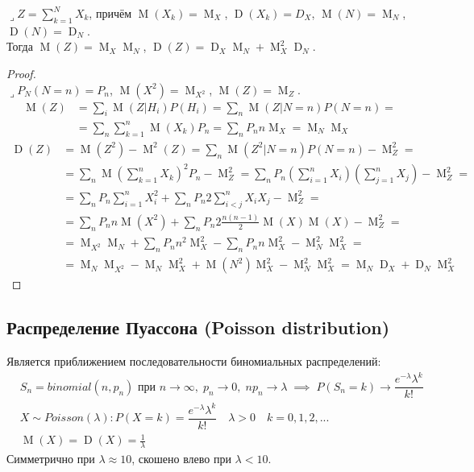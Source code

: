 \documentclass[a4paper,12pt,fleqn]{article}
\newenvironment{onsamepage} {\begin{minipage}{\textwidth}} {\end{minipage}}
\numberwithin{figure}{section}
\theoremstyle{definition}
\DeclareMathOperator{\M}{M}
\DeclareMathOperator{\D}{D}
\def\lets{{\huge$\lrcorner$}\space}
\begin{document}
\begin{onsamepage}
\lets $Z=\sum_{k=1}^N X_k$,
	причём $\M(X_k)=\M_X$, $\D(X_k)=D_X$, $\M(N)=\M_N$, $\D(N)=\D_N$. \\
Тогда $\M(Z) = \M_X \M_N$, $\D(Z) = \D_X \M_N + \M_X^2 \D_N$.
\begin{proof} ~\\
\lets $P_N(N=n) = P_n$, $\M(X^2) = \M_{X^2}$, $\M(Z) = \M_Z$.
\begin{align*}
	\M(Z) &= \sum_i \M(Z|H_i) P(H_i) = \sum_n \M(Z|N=n) P(N=n) = \\
	      &= \sum_n \sum_{k=1}^n \M(X_k) P_n = \sum_n P_n n \M_X = \M_N \M_X
\end{align*}
\begin{align*}
	\D(Z) &= \M(Z^2) - \M^2(Z) = \sum_n \M(Z^2|N=n) P(N=n) - \M_Z^2 = \\
		  &= \sum_n \M \left( \sum_{k=1}^n X_k \right)^2 P_n - \M_Z^2 =
	         \sum_n P_n \left( \sum_{i=1}^nX_i \right) \left( \sum_{j=1}^nX_j \right) - \M_Z^2 = \\
		  &= \sum_n P_n \sum_{i=1}^n X_i^2 + \sum_n P_n 2 \sum_{i < j}^n X_i X_j - \M_Z^2 = \\
	      &= \sum_n P_n n \M(X^2) + \sum_n P_n 2 \frac{n(n-1)}{2} \M(X) \M(X) - \M_Z^2 = \\
	      &= \M_{X^2} \M_N + \sum_n P_n n^2 \M_X^2 - \sum_n P_n n \M_X^2 - \M_N^2 \M_X^2 = \\
	      &= \M_N \M_{X^2} - \M_N \M_X^2 + \M(N^2) \M_X^2 - \M_N^2 \M_X^2 = \M_N \D_X + \D_N \M_X^2
\end{align*}
\end{proof}
\end{onsamepage}


\subsection{Распределение Пуассона (Poisson distribution)}

Является приближением последовательности биномиальных распределений:
\begin{align*}
&	S_n=binomial(n,p_n) \text{ при } n\to\infty ,\; p_n\to0 ,\; np_n\to\lambda
\;\implies\; P(S_n=k)\to \dfrac{e^{-\lambda}\lambda^k}{k!}		\\
&	X \sim Poisson(\lambda): P(X=k) = \dfrac{e^{-\lambda}\lambda^k}{k!}
\quad \lambda>0 \quad k=0,1,2,...		\\
&	\M(X) = \D(X) = \frac{1}{\lambda}
\end{align*}
Симметрично при $\lambda \approx 10$, скошено влево при $\lambda<10$.
\end{document}
